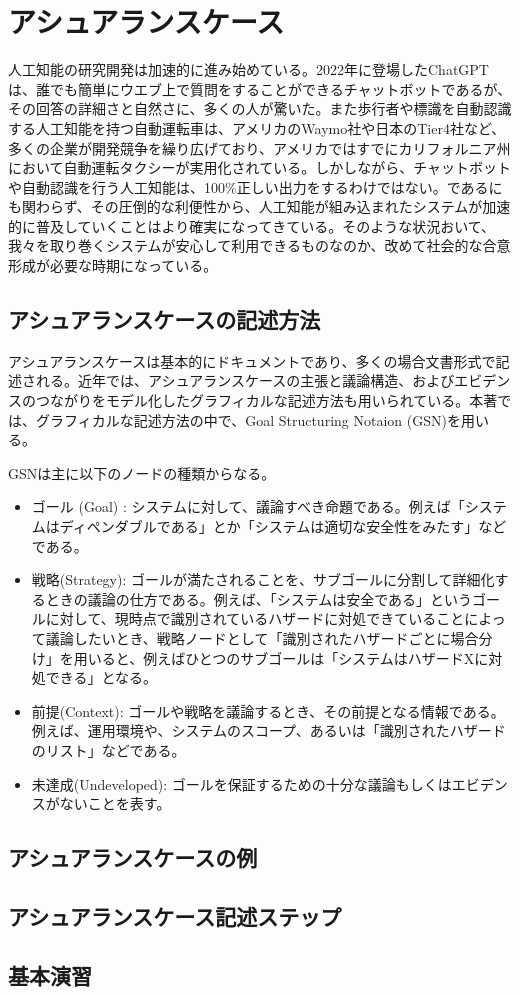 \chapter{アシュアランスケース}
\label{chap3}

人工知能の研究開発は加速的に進み始めている。2022年に登場したChatGPTは、誰でも簡単にウエブ上で質問をすることができるチャットボットであるが、その回答の詳細さと自然さに、多くの人が驚いた。また歩行者や標識を自動認識する人工知能を持つ自動運転車は、アメリカのWaymo社や日本のTier4社など、多くの企業が開発競争を繰り広げており、アメリカではすでにカリフォルニア州において自動運転タクシーが実用化されている。しかしながら、チャットボットや自動認識を行う人工知能は、100\%正しい出力をするわけではない。であるにも関わらず、その圧倒的な利便性から、人工知能が組み込まれたシステムが加速的に普及していくことはより確実になってきている。そのような状況おいて、我々を取り巻くシステムが安心して利用できるものなのか、改めて社会的な合意形成が必要な時期になっている。

\section{アシュアランスケースの記述方法}
アシュアランスケースは基本的にドキュメントであり、多くの場合文書形式で記述される。近年では、アシュアランスケースの主張と議論構造、およびエビデンスのつながりをモデル化したグラフィカルな記述方法も用いられている。本著では、グラフィカルな記述方法の中で、Goal Structuring Notaion (GSN)を用いる。

GSNは主に以下のノードの種類からなる。
\begin{itemize}
\item ゴール (Goal) : 
システムに対して、議論すべき命題である。例えば「システムはディペンダブルである」とか「システムは適切な安全性をみたす」などである。
\item 戦略(Strategy): ゴールが満たされることを、サブゴールに分割して詳細化するときの議論の仕方である。例えば、「システムは安全である」というゴールに対して、現時点で識別されているハザードに対処できていることによって議論したいとき、戦略ノードとして「識別されたハザードごとに場合分け」を用いると、例えばひとつのサブゴールは「システムはハザードXに対処できる」となる。
\item 前提(Context): ゴールや戦略を議論するとき、その前提となる情報である。例えば、運用環境や、システムのスコープ、あるいは「識別されたハザードのリスト」などである。
\item 未達成(Undeveloped): ゴールを保証するための十分な議論もしくはエビデンスがないことを表す。
\end{itemize}
\section{アシュアランスケースの例}
\section{アシュアランスケース記述ステップ}

\section{基本演習}
